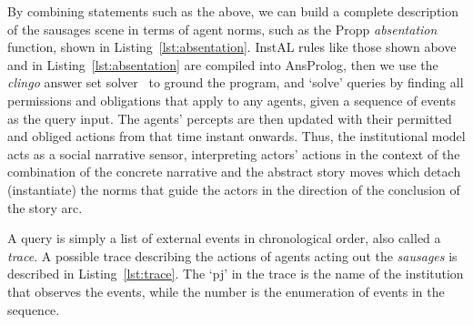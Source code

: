 \documentclass[11pt]{report}
\begin{document}
By combining statements such as the above, we can build a complete description
of the sausages scene in terms of agent norms, such as the Propp
\emph{absentation} function, shown in Listing~\ref{lst:absentation}. InstAL rules like those shown above and in Listing~\ref{lst:absentation} are compiled into AnsProlog, then we use the \emph{clingo} answer set solver~\citep{gebser2011potassco} to ground the program, and `solve' queries by finding all permissions and obligations that apply to any agents, given a sequence of events as the query input. The agents' percepts are then updated with their permitted and obliged actions from that time instant onwards.  Thus, the institutional model acts as a social narrative sensor, interpreting actors' actions in the context of the combination of the concrete narrative and the abstract story moves which detach (instantiate) the norms that guide the actors in the direction of the conclusion of the story arc.

A query is simply a list of external events in chronological order, also called
a \emph{trace}. A possible trace describing the actions of agents acting out the
\emph{sausages} is described in Listing~\ref{lst:trace}. The `pj' in the trace
is the name of the institution that observes the events, while the
number is the enumeration of events in the sequence.
\end{document}
